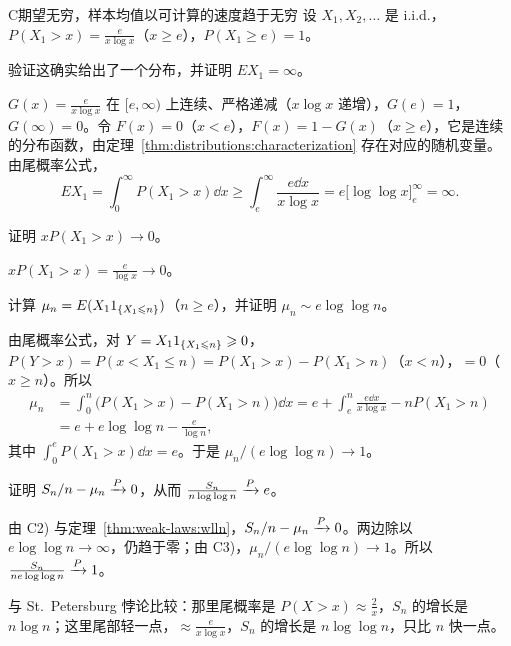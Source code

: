 \begin{probleme}{C}{期望无穷，样本均值以可计算的速度趋于无穷}
设 $X_1,X_2,\dots$ 是 i.i.d.，$P(X_1>x)=\frac e{x\log x}$（$x\geqslant e$），$P(X_1\geqslant e)=1$。
\begin{questions}
\item 验证这确实给出了一个分布，并证明 $EX_1=\infty$。
\begin{solution}
$G(x)=\frac e{x\log x}$ 在 $[e,\infty)$ 上连续、严格递减（$x\log x$ 递增），$G(e)=1$，$G(\infty)=0$。令 $F(x)=0$（$x<e$），$F(x)=1-G(x)$（$x\geqslant e$），它是连续的分布函数，由定理~\ref{thm:distributions:characterization} 存在对应的随机变量。由尾概率公式，
\[
EX_1=\int_0^\infty P(X_1>x)\dd x\geqslant\int_e^\infty\frac{e\dd x}{x\log x}=e\bigl[\log\log x\bigr]_e^\infty=\infty .
\]
\end{solution}
\item 证明 $xP(X_1>x)\to0$。
\begin{solution}
$xP(X_1>x)=\frac e{\log x}\to0$。
\end{solution}
\item 计算 $\mu_n=E(X_11_{\{X_1\leqslant n\}})$（$n\geqslant e$），并证明 $\mu_n\sim e\log\log n$。
\begin{solution}
由尾概率公式，对 $Y=X_11_{\{X_1\leqslant n\}}\geqslant0$，$P(Y>x)=P(x<X_1\leqslant n)=P(X_1>x)-P(X_1>n)$（$x<n$），$=0$（$x\geqslant n$）。所以
\[
\begin{aligned}
\mu_n&=\int_0^n\bigl(P(X_1>x)-P(X_1>n)\bigr)\dd x=e+\int_e^n\frac{e\dd x}{x\log x}-nP(X_1>n)\\
&=e+e\log\log n-\frac e{\log n},
\end{aligned}
\]
其中 $\int_0^eP(X_1>x)\dd x=e$。于是 $\mu_n/(e\log\log n)\to1$。
\end{solution}
\item 证明 $S_n/n-\mu_n\xrightarrow{P}0$，从而 $\frac{S_n}{n\log\log n}\xrightarrow{P} e$。
\begin{solution}
由 C2) 与定理~\ref{thm:weak-laws:wlln}，$S_n/n-\mu_n\xrightarrow{P}0$。两边除以 $e\log\log n\to\infty$，仍趋于零；由 C3)，$\mu_n/(e\log\log n)\to1$。所以 $\frac{S_n}{ne\log\log n}\xrightarrow{P}1$。

与 St.\ Petersburg 悖论比较：那里尾概率是 $P(X>x)\approx\frac2x$，$S_n$ 的增长是 $n\log n$；这里尾部轻一点，$\approx\frac e{x\log x}$，$S_n$ 的增长是 $n\log\log n$，只比 $n$ 快一点。
\end{solution}
\end{questions}
\end{probleme}

\thinkingpart

